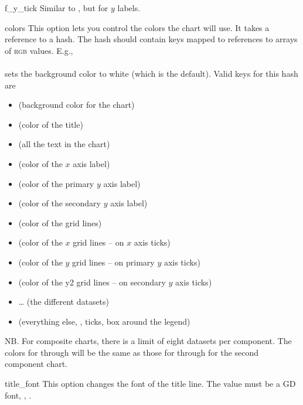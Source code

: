 \begin{AttrDecl}{f\_y\_tick}
Similar to , but for $y$ labels.
\end{AttrDecl}

\begin{AttrDecl}{colors}
This option lets you control the colors the chart will use. It takes a
reference to a hash. The hash should contain keys mapped to references
to arrays of \textsc{rgb} values. E.g.,\\
\\
sets the background color to white (which is the default).
Valid keys for this hash are
\begin{itemize}
\item {} (background color for the chart)
\item {} (color of the title)
\item {} (all the text in the chart)
\item {} (color of the $x$ axis label)
\item {} (color of the primary $y$ axis label)
\item {} (color of the secondary $y$ axis label)
\item {} (color of the grid lines)
\item {} (color of the $x$ grid lines -- on $x$ axis ticks)
\item {} (color of the $y$ grid lines -- on primary $y$ axis ticks)
\item {} (color of the y2 grid lines -- on secondary $y$ axis ticks)
\item {} \ldots {} (the different datasets)
\item {} (everything else, \eg, ticks, box around the legend)
\end{itemize}

NB. For composite charts, there is a limit of eight datasets per
component. The colors for  through 
will be the same as those for  through
 for the second component chart.
\end{AttrDecl}

\begin{AttrDecl}{title\_font}
This option changes the font of the title line. The value must be a GD
font, \eg, .
\end{AttrDecl}

